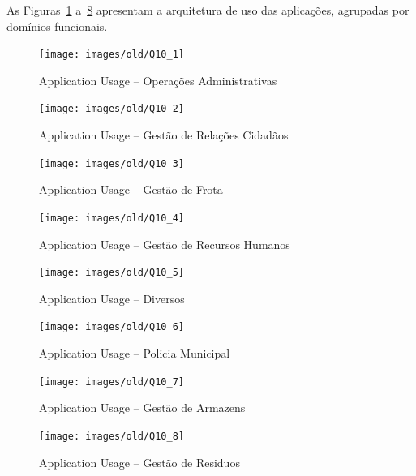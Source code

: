 \documentclass[12pt,a4paper,final]{article}
\begin{document}
    As Figuras~\ref{fig:q10_1} a~\ref{fig:q10_8} apresentam a arquitetura de uso das aplicações, agrupadas por domínios funcionais.

    \vspace{0.5cm}

    \begin{figure}[H]
        \centering
        \texttt{[image: images/old/Q10\_1]}
        \caption{Application Usage – Operações Administrativas}
        \label{fig:q10_1}
    \end{figure}

    \begin{figure}[H]
        \centering
        \texttt{[image: images/old/Q10\_2]}
        \caption{Application Usage – Gestão de Relações Cidadãos}
        \label{fig:q10_2}
    \end{figure}

    \begin{figure}[H]
        \centering
        \texttt{[image: images/old/Q10\_3]}
        \caption{Application Usage – Gestão de Frota}
        \label{fig:q10_3}
    \end{figure}

    \begin{figure}[H]
        \centering
        \texttt{[image: images/old/Q10\_4]}
        \caption{Application Usage – Gestão de Recursos Humanos}
        \label{fig:q10_4}
    \end{figure}

    \begin{figure}[H]
        \centering
        \texttt{[image: images/old/Q10\_5]}
        \caption{Application Usage – Diversos}
        \label{fig:q10_5}
    \end{figure}

    \begin{figure}[H]
        \centering
        \texttt{[image: images/old/Q10\_6]}
        \caption{Application Usage – Policia Municipal}
        \label{fig:q10_6}
    \end{figure}

    \begin{figure}[H]
        \centering
        \texttt{[image: images/old/Q10\_7]}
        \caption{Application Usage – Gestão de Armazens}
        \label{fig:q10_7}
    \end{figure}

    \begin{figure}[H]
        \centering
        \texttt{[image: images/old/Q10\_8]}
        \caption{Application Usage – Gestão de Residuos}
        \label{fig:q10_8}
    \end{figure}
\end{document}
